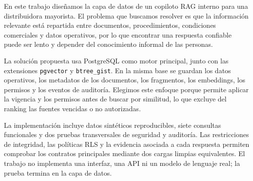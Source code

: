 En este trabajo diseñamos la capa de datos de un copiloto RAG interno para una distribuidora mayorista. El problema que buscamos resolver es que la información relevante está repartida entre documentos, procedimientos, condiciones comerciales y datos operativos, por lo que encontrar una respuesta confiable puede ser lento y depender del conocimiento informal de las personas.

La solución propuesta usa PostgreSQL como motor principal, junto con las extensiones \texttt{pgvector} y \texttt{btree\_gist}. En la misma base se guardan los datos operativos, los metadatos de los documentos, los fragmentos, los embeddings, los permisos y los eventos de auditoría. Elegimos este enfoque porque permite aplicar la vigencia y los permisos antes de buscar por similitud, lo que excluye del ranking las fuentes vencidas o no autorizadas.

La implementación incluye datos sintéticos reproducibles, siete consultas funcionales y dos pruebas transversales de seguridad y auditoría. Las restricciones de integridad, las políticas RLS y la evidencia asociada a cada respuesta permiten comprobar los contratos principales mediante dos cargas limpias equivalentes. El trabajo no implementa una interfaz, una API ni un modelo de lenguaje real; la prueba termina en la capa de datos.
